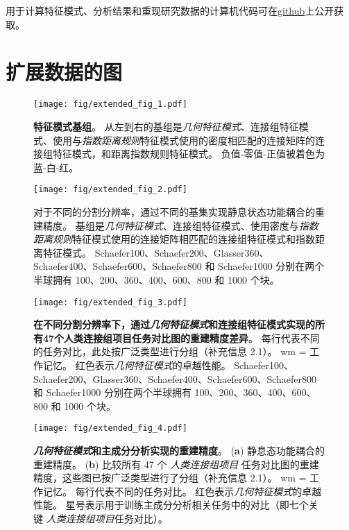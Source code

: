 \documentclass[lang=cn,a4paper,newtx]{elegantpaper}
\begin{document}
用于计算特征模式、分析结果和重现研究数据的计算机代码可在\href{https://github.com/NSBLab/BrainEigenmodes}{github}上公开获取。



\section{扩展数据的图}


\begin{figure}[!htb] 
	\centering
	\texttt{[image: fig/extended\_fig\_1.pdf]}
	\caption{\textbf{特征模式基组}。
		从左到右的基组是\textit{几何特征模式}、连接组特征模式、使用与\textit{指数距离规则}特征模式使用的密度相匹配的连接矩阵的连接组特征模式，和距离指数规则特征模式。 
		负值-零值-正值被着色为蓝-白-红。
	} \label{fig:extended_fig_1}
\end{figure}


\begin{figure}[!htb] 
	\centering
	\texttt{[image: fig/extended\_fig\_2.pdf]}
	\caption{对于不同的分割分辨率，通过不同的基集实现静息状态功能耦合的重建精度。 
		基组是\textit{几何特征模式}、连接组特征模式、使用密度与\textit{指数距离规则}特征模式使用的连接矩阵相匹配的连接组特征模式和指数距离特征模式。
		Schaefer100、Schaefer200、Glasser360、Schaefer400、Schaefer600、Schaefer800 和 Schaefer1000 分别在两个半球拥有 100、200、360、400、600、800 和 1000 个块。
	} \label{fig:extended_fig_2}
\end{figure}


\begin{figure}[!htb] 
	\centering
	\texttt{[image: fig/extended\_fig\_3.pdf]}
	\caption{\textbf{在不同分割分辨率下，通过\textit{几何特征模式}和连接组特征模式实现的所有47个人类连接组项目任务对比图的重建精度差异}。
	每行代表不同的任务对比，此处按广泛类型进行分组（补充信息 2.1）。
	wm = 工作记忆。
	红色表示\textit{几何特征模式}的卓越性能。
	Schaefer100、Schaefer200、Glasser360、Schaefer400、Schaefer600、Schaefer800 和 Schaefer1000 分别在两个半球拥有 100、200、360、400、600、800 和 1000 个块。}
	\label{fig:extended_fig_3}
\end{figure}


\begin{figure}[!htb] 
	\centering
	\texttt{[image: fig/extended\_fig\_4.pdf]}
	\caption{\textbf{\textit{几何特征模式}和主成分分析实现的重建精度}。
	(\textbf{a}) 静息态功能耦合的重建精度。
	(\textbf{b}) 比较所有 47 个 \textit{人类连接组项目} 任务对比图的重建精度，这些图已按广泛类型进行了分组（补充信息 2.1）。
	wm = 工作记忆。
	每行代表不同的任务对比。
	红色表示\textit{几何特征模式}的卓越性能。
	星号表示用于训练主成分分析相关任务中的对比（即七个关键 \textit{人类连接组项目}任务对比）。}
	\label{fig:extended_fig_4}
\end{figure}
\end{document}
